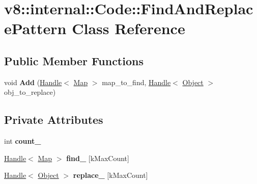 \hypertarget{classv8_1_1internal_1_1_code_1_1_find_and_replace_pattern}{}\section{v8\+:\+:internal\+:\+:Code\+:\+:Find\+And\+Replace\+Pattern Class Reference}
\label{classv8_1_1internal_1_1_code_1_1_find_and_replace_pattern}
\subsection*{Public Member Functions}
\begin{DoxyCompactItemize}
\item 
void {\bfseries Add} (\hyperlink{classv8_1_1internal_1_1_handle}{Handle}$<$ \hyperlink{classv8_1_1internal_1_1_map}{Map} $>$ map\+\_\+to\+\_\+find, \hyperlink{classv8_1_1internal_1_1_handle}{Handle}$<$ \hyperlink{classv8_1_1internal_1_1_object}{Object} $>$ obj\+\_\+to\+\_\+replace)\hypertarget{classv8_1_1internal_1_1_code_1_1_find_and_replace_pattern_a0974183977f76457b00b85ab22a32984}{}\label{classv8_1_1internal_1_1_code_1_1_find_and_replace_pattern_a0974183977f76457b00b85ab22a32984}

\end{DoxyCompactItemize}
\subsection*{Private Attributes}
\begin{DoxyCompactItemize}
\item 
int {\bfseries count\+\_\+}\hypertarget{classv8_1_1internal_1_1_code_1_1_find_and_replace_pattern_ae287a95ee6c3307cd245e1523dbeb199}{}\label{classv8_1_1internal_1_1_code_1_1_find_and_replace_pattern_ae287a95ee6c3307cd245e1523dbeb199}

\item 
\hyperlink{classv8_1_1internal_1_1_handle}{Handle}$<$ \hyperlink{classv8_1_1internal_1_1_map}{Map} $>$ {\bfseries find\+\_\+} \mbox{[}k\+Max\+Count\mbox{]}\hypertarget{classv8_1_1internal_1_1_code_1_1_find_and_replace_pattern_a248502acbce12ef796889221f7d534cd}{}\label{classv8_1_1internal_1_1_code_1_1_find_and_replace_pattern_a248502acbce12ef796889221f7d534cd}

\item 
\hyperlink{classv8_1_1internal_1_1_handle}{Handle}$<$ \hyperlink{classv8_1_1internal_1_1_object}{Object} $>$ {\bfseries replace\+\_\+} \mbox{[}k\+Max\+Count\mbox{]}\hypertarget{classv8_1_1internal_1_1_code_1_1_find_and_replace_pattern_a92c275000de5b6429f639c23b322b744}{}\label{classv8_1_1internal_1_1_code_1_1_find_and_replace_pattern_a92c275000de5b6429f639c23b322b744}

\end{DoxyCompactItemize}
